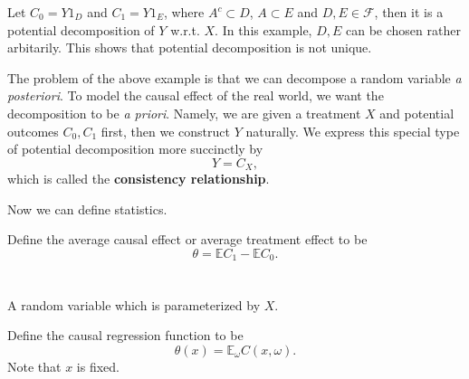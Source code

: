 \begin{example}
    Let $C_0=Y1_{D}$ and $C_1=Y1_E$, where $A^c\subset D$, $A\subset E$ and $D,E\in\mathcal{F}$, then it is a potential decomposition of $Y$ w.r.t. $X$. 
    In this example, $D,E$ can be chosen rather arbitarily. This shows that potential decomposition is not unique.
\end{example}
The problem of the above example is that we can decompose a random variable \textit{a posteriori}. 
To model the causal effect of the real world, we want the decomposition to be \textit{a priori}.
Namely, we are given a treatment $X$ and potential outcomes $C_0,C_1$ first, then we construct $Y$ naturally. 
We express this special type of potential decomposition more succinctly by
\begin{equation}
    Y=C_X,
\end{equation}
which is called the \textbf{consistency relationship}.


Now we can define statistics.

\begin{definition}
    Define the average causal effect or average treatment effect to be
    \begin{equation}
        \theta=\mathbb{E}C_1-\mathbb{E}C_0.
    \end{equation}
\end{definition}

\section{}
\begin{definition}
    A random variable which is parameterized by $X$.
\end{definition}

\begin{definition}
    Define the causal regression function to be 
    \begin{equation}
        \theta(x)=\mathbb{E}_\omega C(x,\omega).
    \end{equation}
    Note that $x$ is fixed.
\end{definition}


